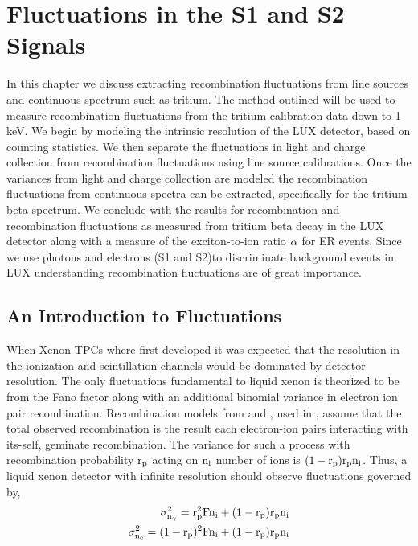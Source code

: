 \renewcommand{\thechapter}{5}
\newcommand{\rp}{$\rm r_p \: $}

\chapter{Fluctuations in the S1 and S2 Signals}
\label{Ch:Flucs}

In this chapter we discuss extracting recombination fluctuations from line sources and continuous spectrum such as tritium. The method outlined will be used to measure recombination fluctuations from the tritium calibration data down to 1 keV. We begin by modeling the intrinsic resolution of the LUX detector, based on counting statistics. We then separate the fluctuations in light and charge collection from recombination fluctuations using line source calibrations. Once the variances from light and charge collection are modeled the recombination fluctuations from continuous spectra can be extracted, specifically for the tritium beta spectrum. We conclude with the results for recombination and recombination fluctuations as measured from tritium beta decay in the LUX detector along with a measure of the exciton-to-ion ratio $\rm \alpha$ for ER events. Since we use photons and electrons (S1 and S2)to discriminate background events in LUX understanding recombination fluctuations are of great importance.

\section{An Introduction to Fluctuations}

When Xenon TPCs where first developed it was expected that the resolution in the ionization and scintillation channels would be dominated by detector resolution. The only fluctuations fundamental to liquid xenon is theorized to be from the Fano factor along with an additional binomial variance in electron ion pair recombination. Recombination models from \cite{Thomas_Imel} and \cite{Birks}, used in \cite{NEST_2013}, assume that the total observed recombination is the result each electron-ion pairs interacting with its-self, geminate recombination. The variance for such a process with recombination probability $\rm r_p$ acting on $\rm n_i$ number of ions is $\rm (1-r_p)r_pn_i$. Thus, a liquid xenon detector with infinite resolution should observe fluctuations governed by, 
\begin{equation}
\begin{split}
\rm \sigma_{n_\gamma}^2=r_p^2Fn_i + (1-r_p)r_p n_i \\
\rm \sigma_{n_e}^2=(1-r_p)^2Fn_i + (1-r_p)r_p n_i
\label{eq:Fano_Intro}
\end{split}
\end{equation}

